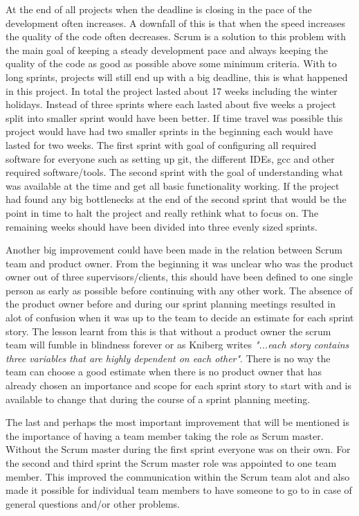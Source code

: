 At the end of all projects when the deadline is closing in the pace of the development often increases.
A downfall of this is that when the speed increases the quality of the code often decreases.
Scrum is a solution to this problem with the main goal of keeping a steady development pace and always keeping the quality of the code as good as possible above some minimum criteria.
With to long sprints, projects will still end up with a big deadline, this is what happened in this project.
In total the project lasted about 17 weeks including the winter holidays.
Instead of three sprints where each lasted about five weeks a project split into smaller sprint would have been better.
If time travel was possible this project would have had two smaller sprints in the beginning each would have lasted for two weeks.
The first sprint with goal of configuring all required software for everyone such as setting up git, the different IDEs, gcc and other required software/tools.
The second sprint with the goal of understanding what was available at the time and get all basic functionality working.
If the project had found any big bottlenecks at the end of the second sprint that would be the point in time to halt the project and really rethink what to focus on.
The remaining weeks should have been divided into three evenly sized sprints.

Another big improvement could have been made in the relation between Scrum team and product owner.
From the beginning it was unclear who was the product owner out of three supervisors/clients, this should have been defined to one single person as early as possible before continuing with any other work.
The absence of the product owner before and during our sprint planning meetings resulted in alot of confusion when it was up to the team to decide an estimate for each sprint story.
The lesson learnt from this is that without a product owner the scrum team will fumble in blindness forever or as Kniberg writes \cite[p.~25]{kniberg07} {\em "...each story contains three variables that are highly dependent on each other"}.
There is no way the team can choose a good estimate when there is no product owner that has already chosen an importance and scope for each sprint story to start with and is available to change that during the course of a sprint planning meeting.

The last and perhaps the most important improvement that will be mentioned is the importance of having a team member taking the role as Scrum master.
Without the Scrum master during the first sprint everyone was on their own.
For the second and third sprint the Scrum master role was appointed to one team member.
This improved the communication within the Scrum team alot and also made it possible for individual team members to have someone to go to in case of general questions and/or other problems.

